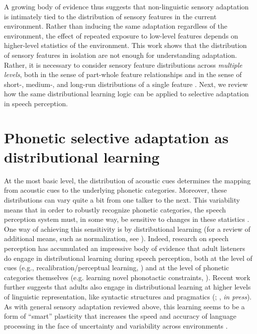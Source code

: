 A growing body of evidence thus suggests that non-linguistic sensory adaptation is intimately tied to the distribution of sensory features in the current environment.
Rather than inducing the same adaptation regardless of the environment, the effect of repeated exposure to low-level features depends on higher-level statistics of the environment. 
This work shows that the distribution of sensory features in isolation are not enough for understanding adaptation.  Rather, it is necessary to consider sensory feature distributions across \emph{multiple levels}, both in the sense of part-whole feature relationships \cite{He2012} and in the sense of short-, medium-, and long-run distributions of a single feature \cite{Chopin2012}.
Next, we review how the same distributional learning logic can be applied to selective adaptation in speech perception.


\section{Phonetic selective adaptation as distributional learning}
\label{sec:select-adapt-as}

At the most basic level, the distribution of acoustic cues determines the mapping from acoustic cues to the underlying phonetic categories.  Moreover, these distributions can vary quite a bit from one talker to the next.  This variability means that in order to robustly recognize phonetic categories, the speech perception system must, in some way, be sensitive to changes in these statistics \cite{Kleinschmidt2015,McMurray2011a}.  One way of achieving this sensitivity is by distributional learning
(for a review of additional means, such as normalization, see ). 
Indeed, research on speech perception has accumulated an impressive body of evidence that adult listeners do engage in distributional learning during speech perception, both at the level of cues (e.g., recalibration/perceptual learning, ) and at the level of phonetic categories themselves (e.g. learning novel phonotactic constraints, ).  Recent work further suggests that adults also engage in distributional learning at higher levels of linguistic representation, like syntactic structures \cite{Chang2006,Fine2013c,Jaeger2013a,Kamide2012} and pragmatics (; \citeauthor{YildirimInPress}, \emph{in press}).  As with general sensory adaptation reviewed above, this learning seems to be a form of ``smart'' plasticity that increases the speed and accuracy of language processing in the face of uncertainty and variability across environments \cite<for review, see>{Kleinschmidt2015}.

